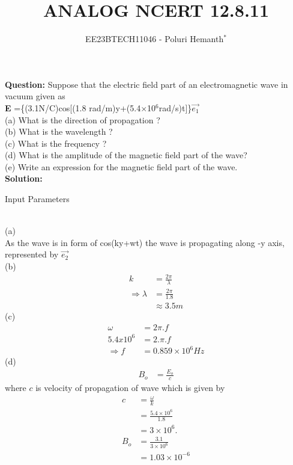\documentclass[journal,12pt,twocolumn]{IEEEtran}
\theoremstyle{remark}
\begin{document}

\vspace{3cm}

\title{ANALOG NCERT 12.8.11}
\author{EE23BTECH11046 - Poluri Hemanth$^{*}$}
\maketitle
\textbf{Question:}
Suppose that the electric field part of an electromagnetic wave
in vacuum given as\\ \textbf{E} =\{(3.1N/C)cos[(1.8 rad/m)y+(5.4$\times$10$^{6}$rad/s)t]\}$\vec{e_1}$ \\
(a) What is the direction of propagation ?\\
(b) What is the wavelength ? \\
(c) What is the frequency ?\\
(d) What is the amplitude of the magnetic field part of the wave?\\
(e) Write an expression for the magnetic field part of the wave.\\
\textbf{Solution:}
\begin{table}[h!]
    
    \caption{Input Parameters}
    \label{tab:12.8.11}
\end{table}\\
(a)\\
As the wave is in form of cos(ky+wt)
the wave is propagating along -y axis, represented by $\vec{e_2}$\\
(b)
\begin{align}
	k&=\frac{2\pi}{\lambda} \\
	\Rightarrow\lambda&=\frac{2\pi}{1.8}\\
	&\approx3.5m
\end{align}
(c)
\begin{align} 
	\omega&=2\pi.f \\
	 5.4 x 10^{6} &=2.\pi.f \\
	\Rightarrow f &= 0.859 \times 10^{6} Hz    
\end{align}
(d)
\begin{align}
	B_o&=\frac{E_o}{c}
\end{align}
where $c$ is velocity of propagation of wave which is given by
\begin{align}
	c&=\frac{\omega}{k} \\
	&=\frac{5.4 \times 10^{6}}{1.8}\\
	&=3 \times 10^{6}.\\
	B_o&= \frac{3.1}{3 \times 10^{6}}\\
	&= 1.03 \times 10^{-6}\label{1}
\end{align}
\end{document}
